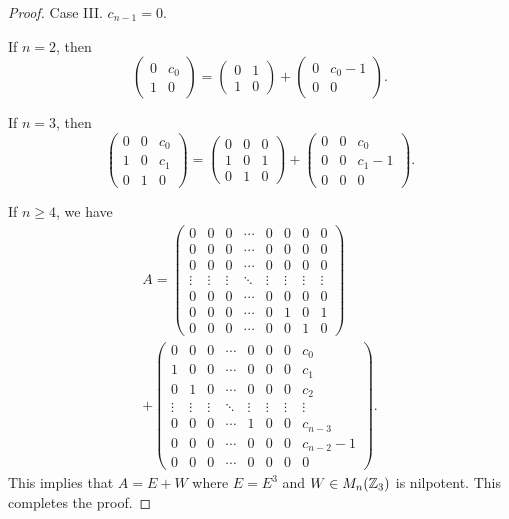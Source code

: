 \documentclass[12pt, reqno]{amsart}
\numberwithin{equation}{section}
\begin{document}
\begin{proof}
Case III. $c_{n-1}=0$.

If $n=2$, then $$\left(
\begin{array}{cc}
0&c_0\\
1&0
\end{array}
\right)=\left(
\begin{array}{cc}
0&1\\
1&0
\end{array}
\right)+\left(
\begin{array}{cc}
0&c_0-1\\
0&0
\end{array}
\right).$$

If $n=3$, then $$\left(
\begin{array}{ccc}
0&0&c_0\\
1&0&c_1\\
0&1&0
\end{array}
\right)=\left(
\begin{array}{ccc}
0&0&0\\
1&0&1\\
0&1&0
\end{array}
\right)+\left(
\begin{array}{ccc}
0&0&c_0\\
0&0&c_1-1\\
0&0&0
\end{array}
\right).$$

If $n\geq 4$, we have
$$\begin{array}{l}
A=\left(
\begin{array}{cccccccc}
0&0&0&\cdots&0&0&0&0\\
0&0&0&\cdots&0&0&0&0\\
0&0&0&\cdots&0&0&0&0\\
\vdots&\vdots&\vdots&\ddots&\vdots&\vdots&\vdots&\vdots\\
0&0&0&\cdots&0&0&0&0\\
0&0&0&\cdots&0&1&0&1\\
0&0&0&\cdots&0&0&1&0
\end{array}
\right)\\
+\left(
\begin{array}{cccccccc}
0&0&0&\cdots&0&0&0&c_0\\
1&0&0&\cdots&0&0&0&c_1\\
0&1&0&\cdots&0&0&0&c_2\\
\vdots&\vdots&\vdots&\ddots&\vdots&\vdots&\vdots&\vdots\\
0&0&0&\cdots&1&0&0&c_{n-3}\\
0&0&0&\cdots&0&0&0&c_{n-2}-1\\
0&0&0&\cdots&0&0&0&0
\end{array}
\right).
\end{array}$$ This implies that $A=E+W$ where $E=E^3$ and $W\in M_n({\Bbb Z}_3)$ is nilpotent. This completes the proof.\end{proof}
\end{document}
